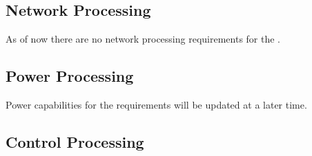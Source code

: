 


\newpage
\subsection{Network Processing}
\label{loc:Capability_Network}

As of now there are no network processing requirements for the \ThisSystem.
% 


\newpage
\subsection{Power Processing}
\label{loc:Capability_Power}

Power capabilities for the \ThisSystem requirements will be updated at a later time.



\newpage
\subsection{Control Processing}
\label{loc:Capability_Control}

